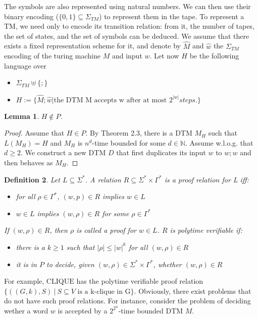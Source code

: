 \documentclass{report}
\newtheorem{definition}{Definition}[chapter]
\newtheorem{lemma}[definition]{Lemma}
\begin{document}
The symbols are also represented using natural numbers. We can then use their binary encoding ($\{0,1\}\subseteq\Sigma_{TM}$) to represent them in the tape. To represent a TM, we need only to encode its transition relation: from it, the number of tapes, the set of states, and the set of symbols can be deduced. We assume that there exists a fixed representation scheme for it, and denote by $\hat{M}$ and $\hat{w}$ the $\Sigma_{TM}$ encoding of the turing machine $M$ and input $w$. Let now $H$ be the following language over
\begin{itemize}
\item[] $\Sigma_{TM} \uplus \{;\}$
\item[] $H := \{ \hat{M};\hat{w} | \text{the DTM M accepts w after at most }2^{|w|} steps.\}$
\end{itemize}

\begin{lemma}
$H \not\in P$.
\end{lemma}

\begin{proof} Assume that  $H \in P$. By Theorem 2.3, there is a DTM $M_H$ such that $L(M_H)=H$ and $M_H$ is $n^d$-time bounded for some $d \in \mathbb{N}$. Assume w.l.o.g. that $d \geq 2$. We construct a new DTM $D$ that first duplicates its input $w$ to $w;w$ and then behaves as $M_H$.
\end{proof}

\begin{definition}
Let $L\subseteq\Sigma^*$. A relation $R\subseteq\Sigma^* \times \Gamma^*$ is a proof relation for L iff:
\begin{itemize}
\item[soundness] for all $\rho\in\Gamma^*$, $(w,p)\in R$ implies $w\in L$
\item[soundness] $w \in L$ implies $(w,\rho)\in R$ for some $\rho\in\Gamma^*$
\end{itemize}
If $(w,\rho)\in R$, then $\rho$ is called a proof for $w\in L$. $R$ is polytime verifiable if:
\begin{itemize}
\item[i] there is a $k\geq1$ such that $|\rho| \leq |w|^k$ for all $(w,\rho)\in R$
\item[ii] it is in $P$ to decide, given $(w,\rho)\in \Sigma^*\times\Gamma^*$, whether $(w,\rho)\in R$
\end{itemize}
\end{definition}
For example, $\mathrm{CLIQUE}$ has the polytime verifiable proof relation $\{((G,k),S)\ |\ S\subseteq V \text{ is a k-clique in G}\}$. Obviously, there exist problems that do not have such proof relations. For instance, consider the problem of deciding wether a word $w$ is accepted by a $2^{2^n}$-time bounded DTM $M$.
\end{document}
